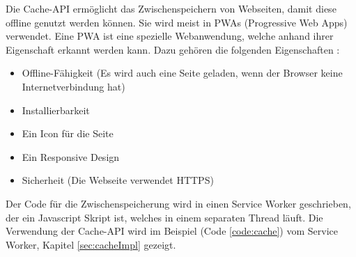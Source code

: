 
Die Cache-API ermöglicht das Zwischenspeichern von Webseiten, damit diese offline genutzt werden können.
Sie wird meist in PWAs (Progressive Web Apps) verwendet. Eine PWA ist eine spezielle Webanwendung, welche anhand ihrer Eigenschaft erkannt werden kann. Dazu gehören die folgenden Eigenschaften \cite{datacodedesignPWA}:
\begin{itemize}
    \item Offline-Fähigkeit (Es wird auch eine Seite geladen, wenn der Browser keine Internetverbindung hat)
    \item Installierbarkeit 
    \item Ein Icon für die Seite
    \item Ein Responsive Design
    \item Sicherheit (Die Webseite verwendet HTTPS)
\end{itemize}

Der Code für die Zwischenspeicherung wird in einen Service Worker geschrieben, der ein Javascript Skript ist, welches in einem separaten Thread läuft. 
Die Verwendung der Cache-API wird im Beispiel (Code \ref{code:cache}) vom Service Worker, Kapitel \ref{sec:cacheImpl} gezeigt.